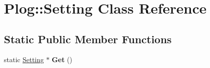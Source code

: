 \hypertarget{classPlog_1_1Setting}{
\section{Plog::Setting Class Reference}
\label{classPlog_1_1Setting}
}
\subsection*{Static Public Member Functions}
\begin{DoxyCompactItemize}
\item 
\hypertarget{classPlog_1_1Setting_a57a98de5300e30c6e7b6116b24844932}{
static \hyperlink{classPlog_1_1Setting}{Setting} $\ast$ {\bfseries Get} ()}
\label{classPlog_1_1Setting_a57a98de5300e30c6e7b6116b24844932}

\end{DoxyCompactItemize}

